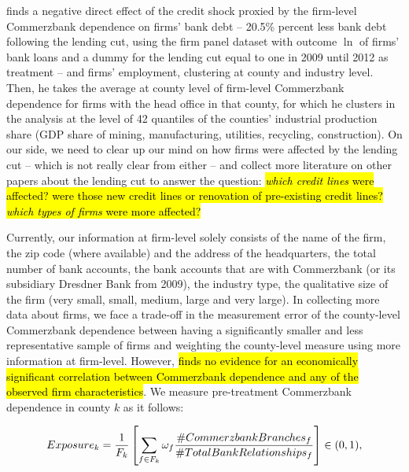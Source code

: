 \documentclass[11pt]{article}
\begin{document}
\citet{bib:huber2018} finds a negative direct effect of the credit shock proxied by the firm-level Commerzbank dependence on firms' bank debt -- 20.5\% percent less bank debt following the lending cut, using the firm panel dataset with outcome $\ln$ of firms' bank loans and a dummy for the lending cut equal to one in 2009 until 2012 as treatment -- and firms' employment, clustering at county and industry level. Then, he takes the average at county level of firm-level Commerzbank dependence for firms with the head office in that county, for which he clusters in the analysis at the level of 42 quantiles of the counties’ industrial production share (GDP share of mining, manufacturing, utilities, recycling, construction). On our side, we need to clear up our mind on how firms were affected by the lending cut -- which is not really clear from \citet{bib:huber2018} either -- and collect more literature on other papers about the lending cut to answer the question: \hl{\textit{which credit lines} were affected? were those new credit lines or renovation of pre-existing credit lines? \textit{which types of firms} were more affected?}

Currently, our information at firm-level solely consists of the name of the firm, the zip code (where available) and the address of the headquarters, the total number of bank accounts, the bank accounts that are with Commerzbank (or its subsidiary Dresdner Bank from 2009), the industry type, the qualitative size of the firm (very small, small, medium, large and very large). In collecting more data about firms, we face a trade-off in the measurement error of the county-level Commerzbank dependence between having a significantly smaller and less representative sample of firms and weighting the county-level measure using more information at firm-level. However, \citet{bib:huber2018} \hl{finds no evidence for an economically significant correlation between Commerzbank dependence and any of the observed firm characteristics}. We measure pre-treatment Commerzbank dependence in county $k$ as it follows:

\begin{equation}
    Exposure_{k} = \frac{1}{F_{k}} \left[ \sum_{f \in F_{k}} \omega_{f} \frac{\# CommerzbankBranches_{f}}{\# Total Bank Relationships_{f}} \right] \in  (0, 1),
\end{equation}
\end{document}

